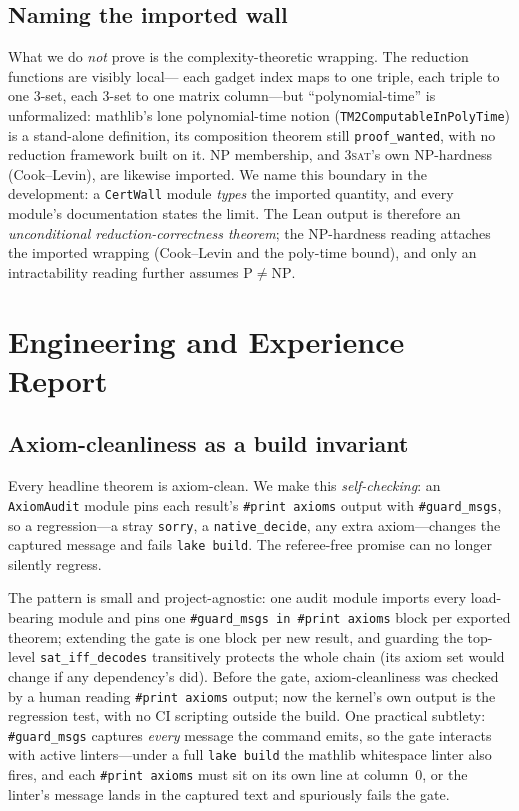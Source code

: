 \documentclass[sigplan,review,anonymous]{acmart}
\begin{document}
\subsection{Naming the imported wall}\label{sec:wall}

What we do \emph{not} prove is the complexity-theoretic wrapping. The reduction functions are visibly local---
each gadget index maps to one triple, each triple to one 3-set, each 3-set to one matrix column---but
``polynomial-time'' is unformalized: mathlib's lone polynomial-time notion
(\lstinline{TM2ComputableInPolyTime}) is a stand-alone definition, its composition theorem still
\lstinline{proof_wanted}, with no reduction framework built on it. NP membership, and \textsc{3sat}'s own
NP-hardness (Cook--Levin), are likewise imported. We name this boundary in the development: a
\lstinline{CertWall} module \emph{types} the imported quantity, and every module's documentation states the
limit. The Lean output is therefore an \emph{unconditional reduction-correctness theorem}; the NP-hardness
reading attaches the imported wrapping (Cook--Levin and the poly-time bound), and only an intractability reading
further assumes $\mathrm P \neq \mathrm{NP}$.

\section{Engineering and Experience Report}\label{sec:eng}

\subsection{Axiom-cleanliness as a build invariant}\label{sec:gate}

Every headline theorem is axiom-clean. We make this \emph{self-checking}: an \lstinline{AxiomAudit} module pins
each result's \lstinline{#print axioms} output with \lstinline{#guard_msgs}, so a regression---a stray
\lstinline{sorry}, a \lstinline{native_decide}, any extra axiom---changes the captured message and fails
\lstinline{lake build}. The referee-free promise can no longer silently regress.

The pattern is small and project-agnostic: one audit module imports every load-bearing module and pins one
\lstinline{#guard_msgs in #print axioms} block per exported theorem; extending the gate is one block per new
result, and guarding the top-level \lstinline{sat_iff_decodes} transitively protects the whole chain (its axiom
set would change if any dependency's did). Before the gate, axiom-cleanliness was checked by a human reading
\lstinline{#print axioms} output; now the kernel's own output is the regression test, with no CI scripting
outside the build. One practical subtlety: \lstinline{#guard_msgs} captures \emph{every} message the command
emits, so the gate interacts with active linters---under a full \lstinline{lake build} the mathlib whitespace
linter also fires, and each \lstinline{#print axioms} must sit on its own line at column~0, or the linter's
message lands in the captured text and spuriously fails the gate.
\end{document}
